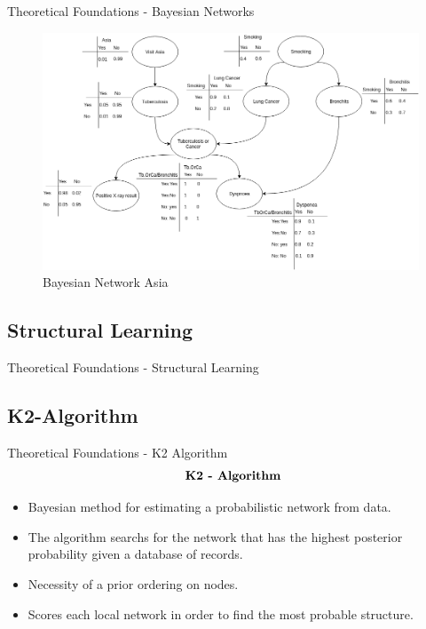 \begin{frame}{Theoretical Foundations - Bayesian Networks}
    \begin{figure}[!h]
        \centering
        \includegraphics[scale=0.3]{figuras/asia_cpt.png}
        \caption{Bayesian Network Asia}
        \label{fig:asia}
    \end{figure}

\end{frame}



\subsection{Structural Learning}
\begin{frame}{Theoretical Foundations - Structural Learning}
 
\end{frame}

\subsection{K2-Algorithm}
\begin{frame}{Theoretical Foundations - K2 Algorithm}
    \begin{align*}
        \centering \textbf{ K2 - Algorithm}
    \end{align*}
    
    \begin{itemize}
        \item {Bayesian method for estimating a probabilistic network from data.}

        \item {The algorithm searchs for the network that has the highest posterior probability given a database of records.}
        \item {Necessity of a prior ordering on nodes.}
        \item { Scores each local network in order to find the most probable structure.}
    \end{itemize}
    
\end{frame}

